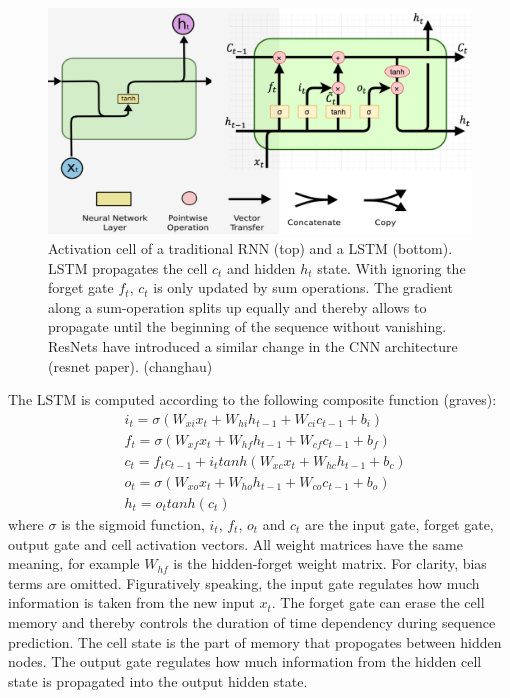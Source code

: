 \begin{figure}
	\centering
	\includegraphics [trim=0 0 0 0, clip, angle=0, width=1.0\columnwidth,
	keepaspectratio]{figures/rnn_lstm}
	\caption{Activation cell of a traditional RNN (top) and a LSTM (bottom). LSTM propagates the cell $c_t$ and hidden $h_t$ state. With ignoring the forget gate $f_t$, $c_t$ is only updated by sum operations. The gradient along a sum-operation splits up equally and thereby allows to propagate until the beginning of the sequence without vanishing. ResNets have introduced a similar change in the CNN architecture (resnet paper). (changhau)} 
	\label{fig:rnn_lstm} 
\end{figure}

The LSTM is computed according to the following composite function (graves):
\begin{equation}
\begin{aligned}
& i_t = \sigma(W_{xi}x_t + W_{hi}h_{t-1} + W_{ci}c_{t-1} + b_i)\\
& f_t = \sigma(W_{xf}x_t + W_{hf}h_{t-1} + W_{cf}c_{t-1} + b_f)\\
& c_t = f_tc_{t-1} + i_ttanh(W_{xc}x_t + W_{hc}h_{t-1} + b_c)\\
& o_t = \sigma(W_{xo}x_t + W_{ho}h_{t-1} + W_{co}c_{t-1} + b_o)\\
& h_t = o_ttanh(c_t)
\end{aligned}
\label{eq:lstm_eq} 
\end{equation}
where $\sigma$ is the sigmoid function, $i_t$, $f_t$, $o_t$ and $c_t$ are the input gate, forget gate, output gate and cell activation vectors.
All weight matrices have the same meaning, for example $W_{hf}$ is the hidden-forget weight matrix.
For clarity, bias terms are omitted.
Figuratively speaking, the input gate regulates how much information is taken from the new input $x_t$.
The forget gate can erase the cell memory and thereby controls the duration of time dependency during sequence prediction.
The cell state is the part of memory that propogates between hidden nodes.
The output gate regulates how much information from the hidden cell state is propagated into the output hidden state.

